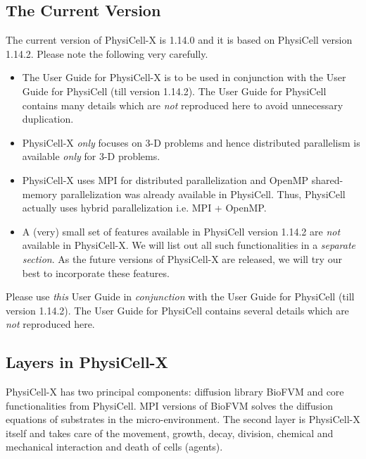 \documentclass[12pt]{article}
\newcommand{\Version}{1.14.0}
\newcommand{\PhysiCellBaseVersion}{1.14.2}
\begin{document}
\subsection{The Current Version}
The current version of PhysiCell-X is {\Version} and it is based on PhysiCell version \PhysiCellBaseVersion. Please note the following very carefully.
\begin{itemize}
    \item The User Guide for PhysiCell-X is to be used in conjunction with the User Guide for PhysiCell (till version {\PhysiCellBaseVersion}). The User Guide for PhysiCell contains many details which are \textit{not} reproduced here to avoid unnecessary duplication.
    \item PhysiCell-X \textit{only} focuses on 3-D problems and hence distributed parallelism is available \textit{only} for 3-D problems. 
    \item PhysiCell-X uses MPI for distributed parallelization and OpenMP shared-memory parallelization was already available in PhysiCell. Thus, PhysiCell actually uses hybrid parallelization i.e. MPI + OpenMP.
    \item A (very) small set of features available in PhysiCell version {\PhysiCellBaseVersion} are \textit{not} available in PhysiCell-X. We will list out all such functionalities in a \textit{separate section}. As the future versions of PhysiCell-X are released, we will try our best to incorporate these features.  
\end{itemize}

\begin{tcolorbox}[enhanced,attach boxed title to top center={yshift=-3mm,yshifttext=-1mm},
  colback=blue!5!white,colframe=blue!75!black,colbacktitle=red!80!black,
  title=IMPORTANT,fonttitle=\bfseries,
  boxed title style={size=small,colframe=red!50!black} ]
  Please use \textit{this} User Guide in \textit{conjunction} with the User Guide for PhysiCell (till version {\PhysiCellBaseVersion}). The User Guide for PhysiCell contains several details which are \textit{not} reproduced here.
\end{tcolorbox}

\subsection{Layers in PhysiCell-X}
PhysiCell-X has two principal components: diffusion library BioFVM and core functionalities from PhysiCell. MPI versions of BioFVM \cite{saxena2021biofvm, estraguesmunoz2026novelscalablehighperformance} solves the diffusion equations of substrates in the micro-environment. The second layer is PhysiCell-X itself and takes care of the movement, growth, decay, division, chemical and mechanical interaction and death of cells (agents). 
\end{document}
